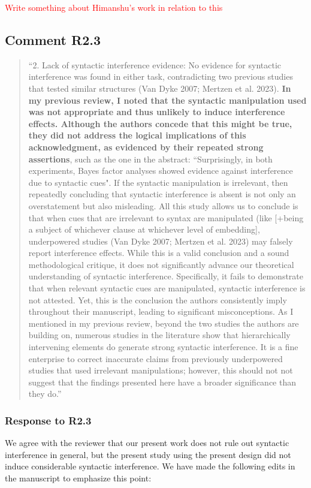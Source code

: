 \documentclass[12pt]{article}
\begin{document}
\textcolor{red}{Write something about Himanshu's work in relation to this}
 
\subsection*{Comment R2.3}

\begin{quote}
``2. Lack of syntactic interference evidence: No evidence for syntactic interference was found in either task, contradicting two previous studies that tested similar structures (Van Dyke 2007; Mertzen et al. 2023). \textbf{In my previous review, I noted that the syntactic manipulation used was not appropriate and thus unlikely to induce interference effects. Although the authors concede that this might be true, they did not address the logical implications of this acknowledgment, as evidenced by their repeated strong assertions}, such as the one in the abstract: ``Surprisingly, in both experiments, Bayes factor analyses showed evidence against interference due to syntactic cues".
If the syntactic manipulation is irrelevant, then repeatedly concluding that syntactic interference is absent is not only an overstatement but also misleading. All this study allows us to conclude is that when cues that are irrelevant to syntax are manipulated (like [+being a subject of whichever clause at whichever level of embedding], underpowered studies (Van Dyke 2007; Mertzen et al. 2023) may falsely report interference effects. While this is a valid conclusion and a sound methodological critique, it does not significantly advance our theoretical understanding of syntactic interference. Specifically, it fails to demonstrate that when relevant syntactic cues are manipulated, syntactic interference is not attested. Yet, this is the conclusion the authors consistently imply throughout their manuscript, leading to significant misconceptions. As I mentioned in my previous review, beyond the two studies the authors are building on, numerous studies in the literature show that hierarchically intervening elements do generate strong syntactic interference.
It is a fine enterprise to correct inaccurate claims from previously underpowered studies that used irrelevant manipulations; however, this should not not suggest that the findings presented here have a broader significance than they do.''
\end{quote}
\subsubsection*{Response to R2.3}
We agree with the reviewer that our present work does not rule out syntactic interference in general, but the present study using the present design did not induce considerable syntactic interference. We have made the following edits in the manuscript to emphasize this point:
\end{document}
